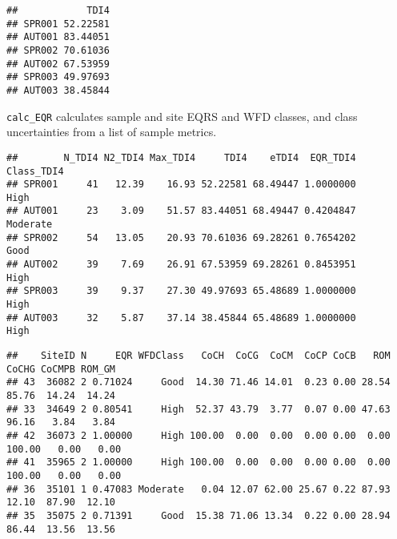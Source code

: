 \documentclass[
]{article}
\newenvironment{Shaded}{\begin{snugshade}}{\end{snugshade}}
\newcommand{\DataTypeTok}[1]{\textcolor[rgb]{0.13,0.29,0.53}{#1}}
\newcommand{\DecValTok}[1]{\textcolor[rgb]{0.00,0.00,0.81}{#1}}
\newcommand{\KeywordTok}[1]{\textcolor[rgb]{0.13,0.29,0.53}{\textbf{#1}}}
\newcommand{\NormalTok}[1]{#1}
\newcommand{\OperatorTok}[1]{\textcolor[rgb]{0.81,0.36,0.00}{\textbf{#1}}}
\newcommand{\StringTok}[1]{\textcolor[rgb]{0.31,0.60,0.02}{#1}}
\begin{document}
\begin{verbatim}
##            TDI4
## SPR001 52.22581
## AUT001 83.44051
## SPR002 70.61036
## AUT002 67.53959
## SPR003 49.97693
## AUT003 38.45844
\end{verbatim}

\texttt{calc\_EQR} calculates sample and site EQRS and WFD classes, and
class uncertainties from a list of sample metrics.

\begin{Shaded}
\end{Shaded}

\begin{verbatim}
##        N_TDI4 N2_TDI4 Max_TDI4     TDI4    eTDI4  EQR_TDI4 Class_TDI4
## SPR001     41   12.39    16.93 52.22581 68.49447 1.0000000       High
## AUT001     23    3.09    51.57 83.44051 68.49447 0.4204847   Moderate
## SPR002     54   13.05    20.93 70.61036 69.28261 0.7654202       Good
## AUT002     39    7.69    26.91 67.53959 69.28261 0.8453951       High
## SPR003     39    9.37    27.30 49.97693 65.48689 1.0000000       High
## AUT003     32    5.87    37.14 38.45844 65.48689 1.0000000       High
\end{verbatim}

\begin{Shaded}
\end{Shaded}

\begin{verbatim}
##    SiteID N     EQR WFDClass   CoCH  CoCG  CoCM  CoCP CoCB   ROM  CoCHG CoCMPB ROM_GM
## 43  36082 2 0.71024     Good  14.30 71.46 14.01  0.23 0.00 28.54  85.76  14.24  14.24
## 33  34649 2 0.80541     High  52.37 43.79  3.77  0.07 0.00 47.63  96.16   3.84   3.84
## 42  36073 2 1.00000     High 100.00  0.00  0.00  0.00 0.00  0.00 100.00   0.00   0.00
## 41  35965 2 1.00000     High 100.00  0.00  0.00  0.00 0.00  0.00 100.00   0.00   0.00
## 36  35101 1 0.47083 Moderate   0.04 12.07 62.00 25.67 0.22 87.93  12.10  87.90  12.10
## 35  35075 2 0.71391     Good  15.38 71.06 13.34  0.22 0.00 28.94  86.44  13.56  13.56
\end{verbatim}
\end{document}

